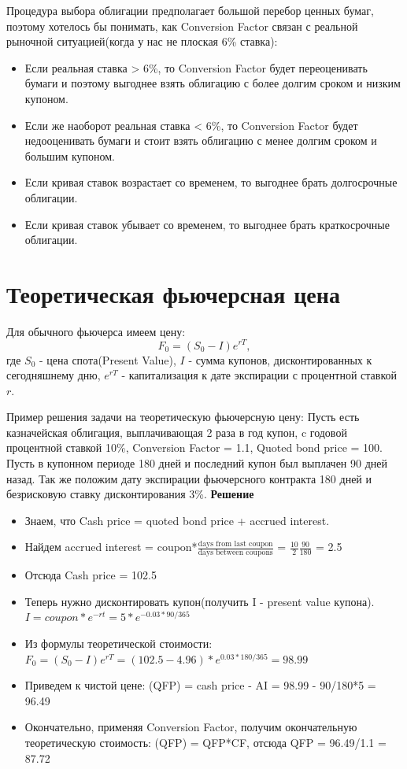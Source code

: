 \documentclass{article}
\begin{document}
Процедура выбора облигации предполагает большой перебор ценных бумаг, поэтому хотелось бы понимать, как Conversion Factor связан с реальной рыночной ситуацией(когда у нас не плоская 6\% ставка):
\begin{itemize}
    \item Если реальная ставка > 6\%, то Conversion Factor будет переоценивать бумаги и поэтому выгоднее взять облигацию с более долгим сроком и низким купоном.
    \item Если же наоборот реальная ставка < 6\%, то Conversion Factor будет недооценивать бумаги и стоит взять облигацию с менее долгим сроком и большим купоном.
    \item Если кривая ставок возрастает со временем, то выгоднее брать долгосрочные облигации.
    \item Если кривая ставок убывает со временем, то выгоднее брать краткосрочные облигации.
\end{itemize}

\section{Теоретическая фьючерсная цена}
Для обычного фьючерса имеем цену:
$$F_{0} = (S_{0} - I)e^{rT},$$
где $S_{0}$ - цена спота(Present Value), $I$ - сумма купонов, дисконтированных к сегодняшнему дню, $e^{rT}$ - капитализация к дате экспирации с процентной ставкой $r$.

Пример решения задачи на теоретическую фьючерсную цену:
Пусть есть казначейская облигация, выплачивающая 2 раза в год купон, c годовой процентной ставкой 10\%, Conversion Factor = 1.1, Quoted bond price = 100. Пусть в купонном периоде 180 дней и последний купон был выплачен 90 дней назад. Так же положим дату экспирации фьючерсного контракта 180 дней и безрисковую ставку дисконтирования 3\%.
\textbf{Решение}
\begin{itemize}
    \item Знаем, что Cash price = quoted bond price + accrued interest.
    \item Найдем accrued interest = coupon*$\frac{\text{days from last coupon}}{\text{days between coupons}}$ = $\frac{10}{2}\frac{90}{180}$ = 2.5
    \item Отсюда Cash price = 102.5
    \item Теперь нужно дисконтировать купон(получить I - present value купона). $I = coupon*e^{-rt} = 5*e^{-0.03*90/365}$
    \item Из формулы теоретической стоимости: $F_{0} = (S_{0} - I)e^{rT} = (102.5 - 4.96)*e^{0.03*180/365} = 98.99$
    \item Приведем к чистой цене: (QFP) = cash price - AI = 98.99 - 90/180*5 = 96.49
    \item Окончательно, применяя Conversion Factor, получим окончательную теоретическую стоимость: (QFP) = QFP*CF, отсюда QFP = 96.49/1.1 = 87.72
\end{itemize}
\end{document}
